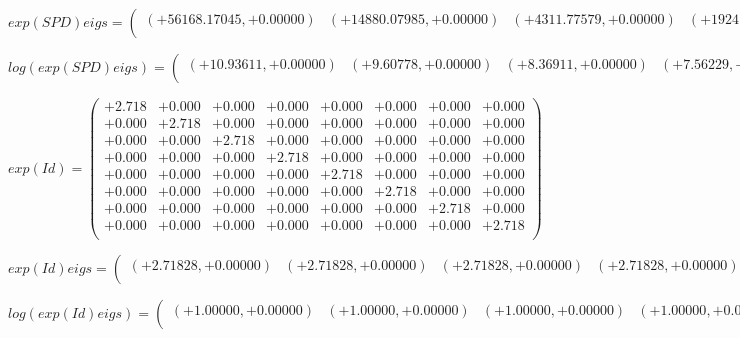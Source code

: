 \documentclass[9pt]{article}
\theoremstyle{plain}
\theoremstyle{definition}
\theoremstyle{remark}
\numberwithin{equation}{section}
\begin{document}
$exp(SPD) eigs = \left(
\begin{array}{
cccccccc}
(+56168.17045,+0.00000) & (+14880.07985,+0.00000) & (+4311.77579,+0.00000) & (+1924.25027,+0.00000) & (+69.17669,+0.00000) & (+339.64809,+0.00000) & (+693.66208,+0.00000) & (+561.93669,+0.00000) \\
\end{array}
\right)$ \newline 

$log(exp(SPD) eigs)  = \left(
\begin{array}{
cccccccc}
(+10.93611,+0.00000) & (+9.60778,+0.00000) & (+8.36911,+0.00000) & (+7.56229,+0.00000) & (+4.23666,+0.00000) & (+5.82791,+0.00000) & (+6.54198,+0.00000) & (+6.33139,+0.00000) \\
\end{array}
\right)$ \newline 

$exp(Id) = \left(
\begin{array}{
cccccccc}
+2.718 & +0.000 & +0.000 & +0.000 & +0.000 & +0.000 & +0.000 & +0.000 \\
+0.000 & +2.718 & +0.000 & +0.000 & +0.000 & +0.000 & +0.000 & +0.000 \\
+0.000 & +0.000 & +2.718 & +0.000 & +0.000 & +0.000 & +0.000 & +0.000 \\
+0.000 & +0.000 & +0.000 & +2.718 & +0.000 & +0.000 & +0.000 & +0.000 \\
+0.000 & +0.000 & +0.000 & +0.000 & +2.718 & +0.000 & +0.000 & +0.000 \\
+0.000 & +0.000 & +0.000 & +0.000 & +0.000 & +2.718 & +0.000 & +0.000 \\
+0.000 & +0.000 & +0.000 & +0.000 & +0.000 & +0.000 & +2.718 & +0.000 \\
+0.000 & +0.000 & +0.000 & +0.000 & +0.000 & +0.000 & +0.000 & +2.718 \\
\end{array}
\right)$ \newline 

$exp(Id) eigs = \left(
\begin{array}{
cccccccc}
(+2.71828,+0.00000) & (+2.71828,+0.00000) & (+2.71828,+0.00000) & (+2.71828,+0.00000) & (+2.71828,+0.00000) & (+2.71828,+0.00000) & (+2.71828,+0.00000) & (+2.71828,+0.00000) \\
\end{array}
\right)$ \newline 

$log(exp(Id) eigs)  = \left(
\begin{array}{
cccccccc}
(+1.00000,+0.00000) & (+1.00000,+0.00000) & (+1.00000,+0.00000) & (+1.00000,+0.00000) & (+1.00000,+0.00000) & (+1.00000,+0.00000) & (+1.00000,+0.00000) & (+1.00000,+0.00000) \\
\end{array}
\right)$ \newline 
\end{document}
